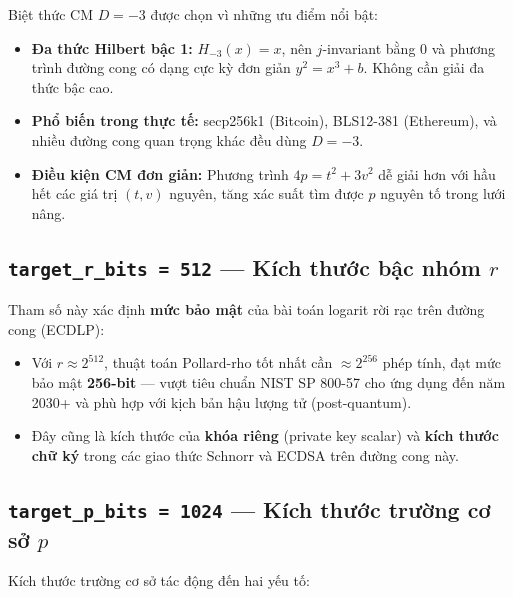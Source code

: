 Biệt thức CM \(D = -3\) được chọn vì những ưu điểm nổi bật:

\begin{itemize}
\tightlist
\item
  \textbf{Đa thức Hilbert bậc 1:} \(H_{-3}(x) = x\), nên \(j\)-invariant
  bằng 0 và phương trình đường cong có dạng cực kỳ đơn giản
  \(y^2 = x^3 + b\). Không cần giải đa thức bậc cao.
\item
  \textbf{Phổ biến trong thực tế:} secp256k1 (Bitcoin), BLS12-381
  (Ethereum), và nhiều đường cong quan trọng khác đều dùng \(D = -3\).
\item
  \textbf{Điều kiện CM đơn giản:} Phương trình \(4p = t^2 + 3v^2\) dễ
  giải hơn với hầu hết các giá trị \((t, v)\) nguyên, tăng xác suất tìm
  được \(p\) nguyên tố trong lưới nâng.
\end{itemize}

\subsection{\texorpdfstring{\texttt{target\_r\_bits\ =\ 512} --- Kích
thước bậc nhóm
\(r\)}{target\_r\_bits = 512 --- Kích thước bậc nhóm r}}\label{target_r_bits-512-kuxedch-thux1b0ux1edbc-bux1eadc-nhuxf3m-r}

Tham số này xác định \textbf{mức bảo mật} của bài toán logarit rời rạc
trên đường cong (ECDLP):

\begin{itemize}
\tightlist
\item
  Với \(r \approx 2^{512}\), thuật toán Pollard-rho tốt nhất cần
  \(\approx 2^{256}\) phép tính, đạt mức bảo mật \textbf{256-bit} ---
  vượt tiêu chuẩn NIST SP 800-57 cho ứng dụng đến năm 2030+ và phù hợp
  với kịch bản hậu lượng tử (post-quantum).
\item
  Đây cũng là kích thước của \textbf{khóa riêng} (private key scalar) và
  \textbf{kích thước chữ ký} trong các giao thức Schnorr và ECDSA trên
  đường cong này.
\end{itemize}

\subsection{\texorpdfstring{\texttt{target\_p\_bits\ =\ 1024} --- Kích
thước trường cơ sở
\(p\)}{target\_p\_bits = 1024 --- Kích thước trường cơ sở p}}\label{target_p_bits-1024-kuxedch-thux1b0ux1edbc-trux1b0ux1eddng-cux1a1-sux1edf-p}

Kích thước trường cơ sở tác động đến hai yếu tố:

